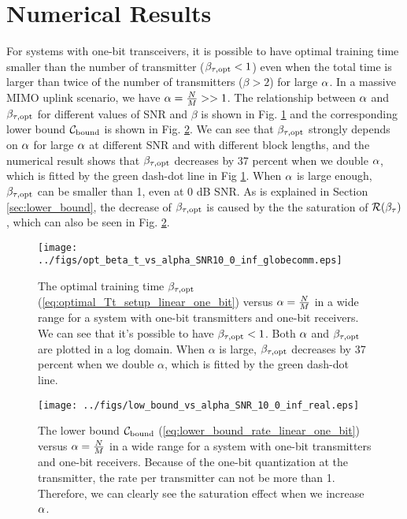 \documentclass[conference]{IEEEtran}
\begin{document}
\section{Numerical Results}
\label{sec:numerical_result}
For systems with one-bit transceivers, it is possible to have optimal training time smaller than the number of transmitter ($\beta_{\rm {\tau,opt}}<1$) even when the total time is larger than twice of the number of transmitters ($\beta>2$) for large $\alpha$. In a massive MIMO uplink scenario, we have $\alpha=\frac{N}{M}>>1$. The relationship between $\alpha$ and $\beta_{\rm {\tau,opt}}$ for different values of SNR and $\beta$ is shown in Fig.   \ref{fig:opt_beta_t_SNR10_0} and the corresponding lower bound $\mathcal{C}_{\rm bound}$ is shown in Fig.  \ref{fig:low_bound_vs_alpha}. We can see that $\beta_{\rm {\tau,opt}}$ strongly depends on $\alpha$ for large $\alpha$ at different SNR and with different block lengths, and the numerical result shows that $\beta_{\rm {\tau,opt}}$ decreases by 37 percent when we double $\alpha$, which is fitted by the green dash-dot line in Fig \ref{fig:opt_beta_t_SNR10_0}. When $\alpha$ is large enough, $\beta_{\rm {\tau,opt}}$ can be smaller than 1, even at 0 dB SNR. As is explained in Section \ref{sec:lower_bound}, the decrease of $\beta_{\rm {\tau,opt}}$ is caused by the the saturation of $\mathcal{R}(\beta_{\rm{\tau}})$, which can also be seen in Fig.  \ref{fig:low_bound_vs_alpha}.

\begin{figure}
\texttt{[image: ../figs/opt\_beta\_t\_vs\_alpha\_SNR10\_0\_inf\_globecomm.eps]}
\centering
    \caption{The optimal training time  $\beta_{\rm {\tau,opt}}$ (\ref{eq:optimal_Tt_setup_linear_one_bit}) versus $\alpha=\frac{N}{M}$ in a wide range for a system with one-bit transmitters and one-bit receivers. We can see that it's possible to have $\beta_{\rm {\tau,opt}}<1$. Both $\alpha$ and $\beta_{\rm {\tau,opt}}$ are plotted in a log domain. When $\alpha$ is large, $\beta_{\rm {\tau,opt}}$ decreases by 37 percent when we double $\alpha$, which is fitted by the green dash-dot line.}
    \label{fig:opt_beta_t_SNR10_0}
\end{figure}

\begin{figure}
\texttt{[image: ../figs/low\_bound\_vs\_alpha\_SNR\_10\_0\_inf\_real.eps]}
\centering
    \caption{The lower bound $\mathcal{C}_{\rm bound}$ (\ref{eq:lower_bound_rate_linear_one_bit}) versus  $\alpha=\frac{N}{M}$ in a wide range for a system with one-bit transmitters and one-bit receivers. Because of the one-bit quantization at the transmitter, the rate per transmitter can not be more than 1. Therefore, we can clearly see the saturation effect when we increase $\alpha$.}
    \label{fig:low_bound_vs_alpha}
\end{figure}
\end{document}
